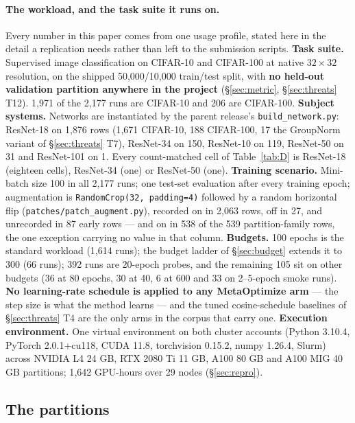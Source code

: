 \documentclass[10pt,letterpaper]{article}
\begin{document}
\paragraph{The workload, and the task suite it runs on.}
Every number in this paper comes from one usage profile, stated here in the detail a replication
needs rather than left to the submission scripts. \textbf{Task suite.} Supervised image
classification on CIFAR-10 and CIFAR-100 \citep{krizhevsky2009cifar} at native $32 \times 32$
resolution, on the shipped 50{,}000/10{,}000 train/test split, with \textbf{no held-out validation
partition anywhere in the project} (\S\ref{sec:metric}, \S\ref{sec:threats} T12). 1{,}971 of the
2{,}177 runs are CIFAR-10 and 206 are CIFAR-100. \textbf{Subject systems.} Networks are
instantiated by the parent release's \texttt{build\_network.py}: ResNet-18 on 1{,}876 rows (1{,}671
CIFAR-10, 188 CIFAR-100, 17 the GroupNorm variant of \S\ref{sec:threats} T7), ResNet-34 on 150,
ResNet-10 on 119, ResNet-50 on 31 and ResNet-101 on 1. Every count-matched cell of
Table~\ref{tab:D} is ResNet-18 (eighteen cells), ResNet-34 (one) or ResNet-50 (one).
\textbf{Training scenario.} Mini-batch size 100 in all 2{,}177 runs; one test-set evaluation after
every training epoch; augmentation is \texttt{RandomCrop(32, padding=4)} followed by a random
horizontal flip (\texttt{patches/patch\_augment.py}), recorded on in 2{,}063 rows, off in 27, and
unrecorded in 87 early rows --- and on in 538 of the 539 partition-family rows, the one exception
carrying no value in that column. \textbf{Budgets.} 100 epochs is the standard workload (1{,}614
runs); the budget ladder of \S\ref{sec:budget} extends it to 300 (66 runs); 392 runs are 20-epoch
probes, and the remaining 105 sit on other budgets (36 at 80 epochs, 30 at 40, 6 at 600 and 33
on 2--5-epoch smoke runs). \textbf{No learning-rate schedule is applied to any MetaOptimize arm}
--- the step size is what the method learns --- and the tuned cosine-schedule baselines of
\S\ref{sec:threats} T4 are the only arms in the corpus that carry one.
\textbf{Execution environment.} One virtual environment on both cluster accounts (Python 3.10.4,
PyTorch 2.0.1+cu118, CUDA 11.8, torchvision 0.15.2, numpy 1.26.4, Slurm) across NVIDIA L4 24 GB,
RTX 2080 Ti 11 GB, A100 80 GB and A100 MIG 40 GB partitions; 1{,}642 GPU-hours over 29 nodes
(\S\ref{sec:repro}).

\subsection{The partitions}
\label{sec:partitions}
\end{document}

